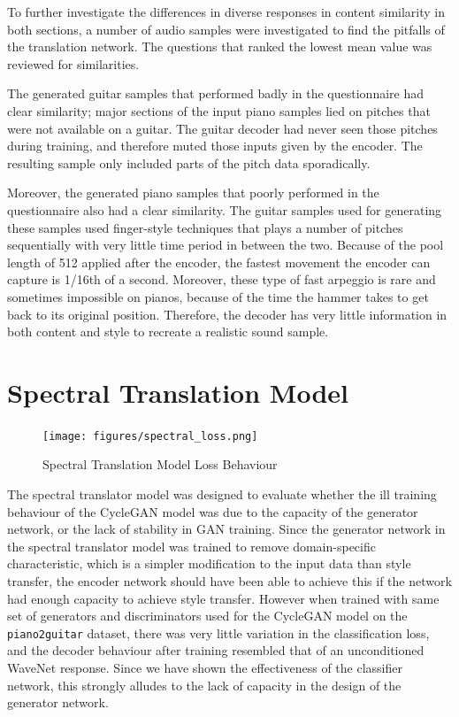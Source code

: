 \documentclass[12pt,a4paper,]{report}
\begin{document}
To further investigate the differences in diverse responses in content
similarity in both sections, a number of audio samples were investigated
to find the pitfalls of the translation network. The questions that
ranked the lowest mean value was reviewed for similarities.

The generated guitar samples that performed badly in the questionnaire
had clear similarity; major sections of the input piano samples lied on
pitches that were not available on a guitar. The guitar decoder had
never seen those pitches during training, and therefore muted those
inputs given by the encoder. The resulting sample only included parts of
the pitch data sporadically.

Moreover, the generated piano samples that poorly performed in the
questionnaire also had a clear similarity. The guitar samples used for
generating these samples used finger-style techniques that plays a
number of pitches sequentially with very little time period in between
the two. Because of the pool length of 512 applied after the encoder,
the fastest movement the encoder can capture is 1/16th of a second.
Moreover, these type of fast arpeggio is rare and sometimes impossible
on pianos, because of the time the hammer takes to get back to its
original position. Therefore, the decoder has very little information in
both content and style to recreate a realistic sound sample.

\hypertarget{spectral-translation-model-1}{%
\section{Spectral Translation
Model}\label{spectral-translation-model-1}}

\begin{figure}[h]
    \texttt{[image: figures/spectral\_loss.png]}
    \centering
    \caption{Spectral Translation Model Loss Behaviour}
\end{figure}

The spectral translator model was designed to evaluate whether the ill
training behaviour of the CycleGAN model was due to the capacity of the
generator network, or the lack of stability in GAN training. Since the
generator network in the spectral translator model was trained to remove
domain-specific characteristic, which is a simpler modification to the
input data than style transfer, the encoder network should have been
able to achieve this if the network had enough capacity to achieve style
transfer. However when trained with same set of generators and
discriminators used for the CycleGAN model on the \texttt{piano2guitar}
dataset, there was very little variation in the classification loss, and
the decoder behaviour after training resembled that of an unconditioned
WaveNet response. Since we have shown the effectiveness of the
classifier network, this strongly alludes to the lack of capacity in the
design of the generator network.
\end{document}
